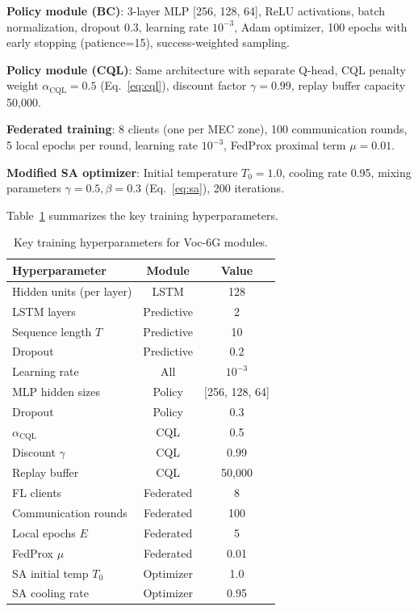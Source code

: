 \documentclass[journal,twoside]{IEEEtran}
\newcommand{\VocSixG}{Voc-6G}
\begin{document}
\textbf{Policy module (BC)}: 3-layer MLP [256, 128, 64], ReLU activations, batch normalization, dropout 0.3, learning rate $10^{-3}$, Adam optimizer, 100 epochs with early stopping (patience=15), success-weighted sampling.

\textbf{Policy module (CQL)}: Same architecture with separate Q-head, CQL penalty weight $\alpha_{\text{CQL}}=0.5$ (Eq.~\ref{eq:cql}), discount factor $\gamma=0.99$, replay buffer capacity 50,000.

\textbf{Federated training}: 8 clients (one per MEC zone), 100 communication rounds, 5 local epochs per round, learning rate $10^{-3}$, FedProx proximal term $\mu=0.01$.

\textbf{Modified SA optimizer}: Initial temperature $T_0=1.0$, cooling rate 0.95, mixing parameters $\gamma=0.5, \beta=0.3$ (Eq.~\ref{eq:sa}), 200 iterations.

Table~\ref{tab:training_config} summarizes the key training hyperparameters.

\begin{table}[t]
\centering
\caption{Key training hyperparameters for \VocSixG{} modules.}
\label{tab:training_config}
\small
\begin{tabular}{lcc}
\toprule
\textbf{Hyperparameter} & \textbf{Module} & \textbf{Value} \\
\midrule
Hidden units (per layer) & LSTM & 128 \\
LSTM layers & Predictive & 2 \\
Sequence length $T$ & Predictive & 10 \\
Dropout & Predictive & 0.2 \\
Learning rate & All & $10^{-3}$ \\
MLP hidden sizes & Policy & [256, 128, 64] \\
Dropout & Policy & 0.3 \\
$\alpha_{\text{CQL}}$ & CQL & 0.5 \\
Discount $\gamma$ & CQL & 0.99 \\
Replay buffer & CQL & 50,000 \\
FL clients & Federated & 8 \\
Communication rounds & Federated & 100 \\
Local epochs $E$ & Federated & 5 \\
FedProx $\mu$ & Federated & 0.01 \\
SA initial temp $T_0$ & Optimizer & 1.0 \\
SA cooling rate & Optimizer & 0.95 \\
\bottomrule
\end{tabular}
\end{table}
\end{document}
